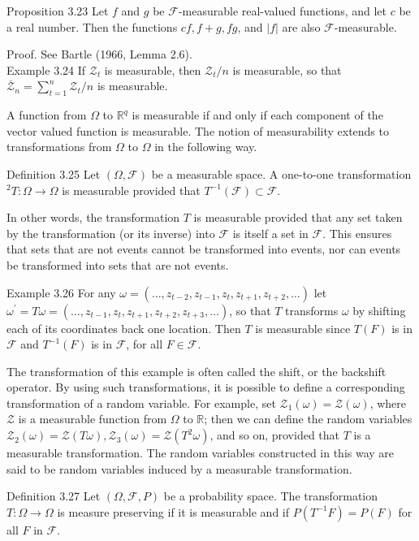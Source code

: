 \documentclass[10pt]{article}
\begin{document}
Proposition 3.23 Let $f$ and $g$ be $\mathcal{F}$-measurable real-valued functions, and let $c$ be a real number. Then the functions $c f, f+g, f g$, and $|f|$ are also $\mathcal{F}$-measurable.

Proof. See Bartle (1966, Lemma 2.6).\\
Example 3.24 If $\mathcal{Z}_{t}$ is measurable, then $\mathcal{Z}_{t} / n$ is measurable, so that $\overline{\mathcal{Z}}_{n}= \sum_{t=1}^{n} \mathcal{Z}_{t} / n$ is measurable.

A function from $\Omega$ to $\mathbb{R}^{q}$ is measurable if and only if each component of the vector valued function is measurable. The notion of measurability extends to transformations from $\Omega$ to $\Omega$ in the following way.

Definition 3.25 Let $(\Omega, \mathcal{F})$ be a measurable space. A one-to-one transformation ${ }^{2} T: \Omega \rightarrow \Omega$ is measurable provided that $T^{-1}(\mathcal{F}) \subset \mathcal{F}$.

In other words, the transformation $T$ is measurable provided that any set taken by the transformation (or its inverse) into $\mathcal{F}$ is itself a set in $\mathcal{F}$. This ensures that sets that are not events cannot be transformed into events, nor can events be transformed into sets that are not events.

Example 3.26 For any $\omega=\left(\ldots, z_{t-2}, z_{t-1}, z_{t}, z_{t+1}, z_{t+2}, \ldots\right)$ let $\omega^{\prime}= T \omega=\left(\ldots, z_{t-1}, z_{t}, z_{t+1}, z_{t+2}, z_{t+3}, \ldots\right)$, so that $T$ transforms $\omega$ by shifting each of its coordinates back one location. Then $T$ is measurable since $T(F)$ is in $\mathcal{F}$ and $T^{-1}(F)$ is in $\mathcal{F}$, for all $F \in \mathcal{F}$.

The transformation of this example is often called the shift, or the backshift operator. By using such transformations, it is possible to define a corresponding transformation of a random variable. For example, set $\mathcal{Z}_{1}(\omega)=\mathcal{Z}(\omega)$, where $\mathcal{Z}$ is a measurable function from $\Omega$ to $\mathbb{R}$; then we can define the random variables $\mathcal{Z}_{2}(\omega)=\mathcal{Z}(T \omega), \mathcal{Z}_{3}(\omega)=\mathcal{Z}\left(T^{2} \omega\right)$, and so on, provided that $T$ is a measurable transformation. The random variables constructed in this way are said to be random variables induced by a measurable transformation.

Definition 3.27 Let $(\Omega, \mathcal{F}, P)$ be a probability space. The transformation $T: \Omega \rightarrow \Omega$ is measure preserving if it is measurable and if $P\left(T^{-1} F\right)= P(F)$ for all $F$ in $\mathcal{F}$.
\end{document}
